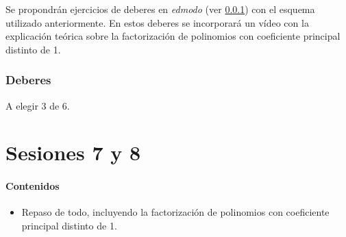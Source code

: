 Se propondrán ejercicios de deberes en \textit{edmodo} (ver \ref{ses6:deberes}) con el esquema utilizado anteriormente.
%
En estos deberes se incorporará un vídeo con la explicación teórica sobre la factorización de polinomios con coeficiente principal distinto de 1.


\subsubsection{Deberes}
\label{ses6:deberes}


\newbloq A elegir 3 de 6.











\section{Sesiones 7 y 8}


\paragraph{Contenidos}
\begin{itemize}
	\item Repaso de todo, incluyendo la factorización de polinomios con coeficiente principal distinto de 1.
\end{itemize}


